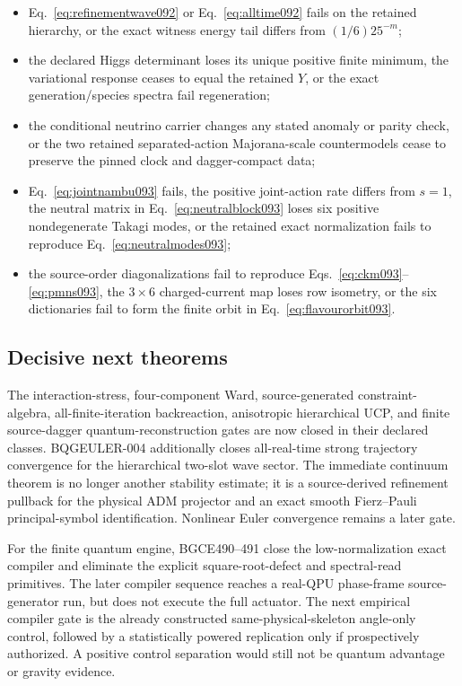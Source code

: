 \documentclass[11pt]{article}
\theoremstyle{definition}
\theoremstyle{remark}
\begin{document}
\begin{itemize}
\item Eq.~\eqref{eq:refinementwave092} or Eq.~\eqref{eq:alltime092} fails on the retained hierarchy, or the exact witness energy tail differs from $(1/6)25^{-m}$;
\item the declared Higgs determinant loses its unique positive finite minimum, the variational response ceases to equal the retained $Y$, or the exact generation/species spectra fail regeneration;
\item the conditional neutrino carrier changes any stated anomaly or parity check, or the two retained separated-action Majorana-scale countermodels cease to preserve the pinned clock and dagger-compact data;
\item Eq.~\eqref{eq:jointnambu093} fails, the positive joint-action rate differs from $s=1$, the neutral matrix in Eq.~\eqref{eq:neutralblock093} loses six positive nondegenerate Takagi modes, or the retained exact normalization fails to reproduce Eq.~\eqref{eq:neutralmodes093};
\item the source-order diagonalizations fail to reproduce Eqs.~\eqref{eq:ckm093}--\eqref{eq:pmns093}, the $3\times6$ charged-current map loses row isometry, or the six dictionaries fail to form the finite orbit in Eq.~\eqref{eq:flavourorbit093}.
\end{itemize}

\subsection{Decisive next theorems}

The interaction-stress, four-component Ward, source-generated constraint-algebra, all-finite-iteration backreaction, anisotropic hierarchical UCP, and finite source-dagger quantum-reconstruction gates are now closed in their declared classes. BQGEULER-004 additionally closes all-real-time strong trajectory convergence for the hierarchical two-slot wave sector. The immediate continuum theorem is no longer another stability estimate; it is a source-derived refinement pullback for the physical ADM projector and an exact smooth Fierz--Pauli principal-symbol identification. Nonlinear Euler convergence remains a later gate.

For the finite quantum engine, BGCE490--491 close the low-normalization exact compiler and eliminate the explicit square-root-defect and spectral-read primitives. The later compiler sequence reaches a real-QPU phase-frame source-generator run, but does not execute the full actuator. The next empirical compiler gate is the already constructed same-physical-skeleton angle-only control, followed by a statistically powered replication only if prospectively authorized. A positive control separation would still not be quantum advantage or gravity evidence.
\end{document}
